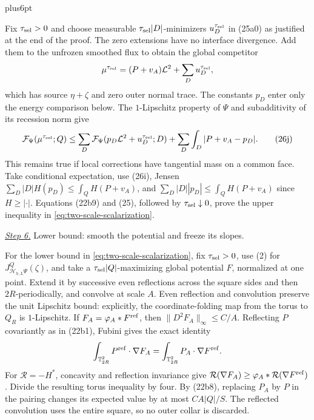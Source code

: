 \documentclass[11pt,reqno]{amsart}
\makeatletter
\theoremstyle{plain}
\theoremstyle{definition}
\theoremstyle{remark}
\renewenvironment{proof}[1][\proofname]{%
  \par
  \pushQED{\qed}%
  \normalfont
  \topsep6pt plus6pt\relax
  \trivlist
  \item[\hskip\labelsep\slshape #1\@addpunct{.}]%
  \ignorespaces
}{%
  \popQED
  \endtrivlist
  \@endpefalse
}
\DeclareRobustCommand{\qed}{%
  \leavevmode\unskip\penalty9999\hbox{}\nobreak
  \ifmmode
    \makebox[0pt][l]{\qquad\hbox{\qedsymbol}}%
  \else
    \qquad\hbox{\qedsymbol}%
  \fi
}
\renewcommand{\qedsymbol}{\rule[.47pt]{4pt}{6pt}}
\numberwithin{equation}{section}
\newcommand{\1}{\mathbf 1}
\makeatother
\begin{document}
\begin{proof}
Fix $\tau_{\rm sel}>0$ and choose measurable
$\tau_{\rm sel}|D|$-minimizers $u_ D^{\tau_{\rm sel}}$ in (25a0)
as justified at the end of the proof.  The zero extensions have no interface divergence.  Add them to the
unfrozen smoothed flux to obtain the global competitor
\begin{equation*}
\mu^{\tau_{\rm sel}}=(P+v_ A)\mathcal L^2+\sum_ Du_ D^{\tau_{\rm sel}},
\end{equation*}
which has source $\eta+\zeta$ and zero outer normal trace.  The constants
$p_D$ enter only the energy comparison below.  The $1$-Lipschitz property of $\Psi$ and
subadditivity of its recession norm give
\begin{equation}
\mathcal F_ \Psi(\mu^{\tau_{\rm sel}};Q)
\leq\sum_ D\mathcal F_ \Psi(p_ D\mathcal L^2+u_ D^{\tau_{\rm sel}};D)
+\sum_ D\int_ D|P+v_ A-p_ D|.
\tag{26j}
\end{equation}
This remains true if local corrections have tangential mass on a common
face.  Take conditional expectation, use (26i), Jensen
$\sum_ D|D|H(p_ D)\leq\int_ QH(P+v_ A)$, and
$\sum_ D|D||p_ D|\leq\int_ QH(P+v_ A)$ since $H\geq|\cdot|$.
Equations (22b9) and (25),
followed by $\tau_{\rm sel}\downarrow0$, prove the upper inequality in
\eqref{eq:two-scale-scalarization}.

\smallskip\noindent
\underline{\textit{Step 6.}} Lower bound: smooth the potential and freeze its slopes.

For the lower bound in \eqref{eq:two-scale-scalarization}, fix
$\tau_{\rm sel}>0$, use (2) for
$J_ {\mathcal H_ {h,L}\Psi}^Q(\zeta)$, and take a
$\tau_{\rm sel}|Q|$-maximizing global potential $F$, normalized at one point.
Extend it by successive even
reflections across the square sides and then $2R$-periodically, and
convolve at scale $A$.  Even reflection and convolution preserve the
unit Lipschitz bound: explicitly, the coordinate-folding map from the
torus to $Q_ R$ is $1$-Lipschitz.  If
$F_ A=\varphi_ A*F^{\rm ref}$, then
$\|D^2F_ A\|_ \infty\leq C/A$.  Reflecting $P$ covariantly as in
(22b1), Fubini gives the exact identity
\begin{equation*}
\int_ {\mathbb T_ {2R}^2}P^{\rm ref}\cdot\nabla F_ A
=\int_ {\mathbb T_ {2R}^2}P_ A\cdot\nabla F^{\rm ref}.
\end{equation*}
For $\mathcal R=-H^*$, concavity and reflection invariance give
$\mathcal R(\nabla F_ A)\geq\varphi_ A*\mathcal R(\nabla F^{\rm ref})$.  Divide the
resulting torus inequality by four.  By (22b8), replacing $P_ A$ by $P$
in the pairing changes its expected value by at most $CA|Q|/S$.
The reflected convolution uses the entire square, so no outer collar
is discarded.


\end{proof}
\end{document}
